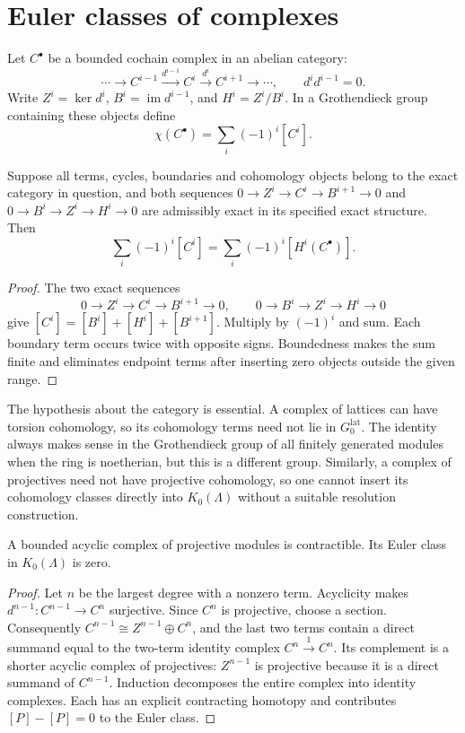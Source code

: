 \section{Euler classes of complexes}

Let $C^\bullet$ be a bounded cochain complex in an abelian category:
\[
\cdots\longrightarrow C^{i-1}\xrightarrow{d^{i-1}}C^i
 \xrightarrow{d^i}C^{i+1}\longrightarrow\cdots,
\qquad d^i d^{i-1}=0.
\]
Write $Z^i=\ker d^i$, $B^i=\operatorname{im}d^{i-1}$, and $H^i=Z^i/B^i$. In a Grothendieck group containing these objects define
\[
\chi(C^\bullet)=\sum_i(-1)^i[C^i].
\]

\begin{theorem}
Suppose all terms, cycles, boundaries and cohomology objects belong to the exact category in question, and both sequences $0\to Z^i\to C^i\to B^{i+1}\to0$ and $0\to B^i\to Z^i\to H^i\to0$ are admissibly exact in its specified exact structure. Then
\[
\sum_i(-1)^i[C^i]=\sum_i(-1)^i[H^i(C^\bullet)].
\]
\end{theorem}
\begin{proof}
The two exact sequences
\[
0\to Z^i\to C^i\to B^{i+1}\to0,
\qquad
0\to B^i\to Z^i\to H^i\to0
\]
give $[C^i]=[B^i]+[H^i]+[B^{i+1}]$. Multiply by $(-1)^i$ and sum. Each boundary term occurs twice with opposite signs. Boundedness makes the sum finite and eliminates endpoint terms after inserting zero objects outside the given range.
\end{proof}

The hypothesis about the category is essential. A complex of lattices can have torsion cohomology, so its cohomology terms need not lie in $G_0^{\mathrm{lat}}$. The identity always makes sense in the Grothendieck group of all finitely generated modules when the ring is noetherian, but this is a different group. Similarly, a complex of projectives need not have projective cohomology, so one cannot insert its cohomology classes directly into $K_0(\Lambda)$ without a suitable resolution construction.

\begin{proposition}
A bounded acyclic complex of projective modules is contractible. Its Euler class in $K_0(\Lambda)$ is zero.
\end{proposition}
\begin{proof}
Let $n$ be the largest degree with a nonzero term. Acyclicity makes $d^{n-1}:C^{n-1}\to C^n$ surjective. Since $C^n$ is projective, choose a section. Consequently $C^{n-1}\cong Z^{n-1}\oplus C^n$, and the last two terms contain a direct summand equal to the two-term identity complex $C^n\xrightarrow{1}C^n$. Its complement is a shorter acyclic complex of projectives: $Z^{n-1}$ is projective because it is a direct summand of $C^{n-1}$. Induction decomposes the entire complex into identity complexes. Each has an explicit contracting homotopy and contributes $[P]-[P]=0$ to the Euler class.
\end{proof}

